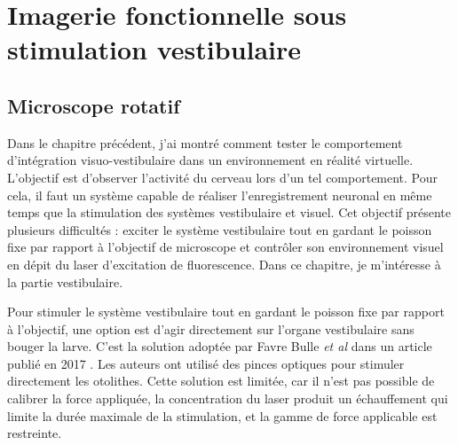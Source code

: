 \chapter[Imagerie sous stim. vestibulaire]{Imagerie fonctionnelle sous \\ stimulation vestibulaire}\label{chapIII}



\section{Microscope rotatif}

Dans le chapitre précédent, j'ai montré comment tester le comportement d'intégration visuo-vestibulaire dans un environnement en réalité virtuelle. L'objectif est d'observer l'activité du cerveau lors d'un tel comportement. Pour cela, il faut un système capable de réaliser l'enregistrement neuronal en même temps que la stimulation des systèmes vestibulaire et visuel. Cet objectif présente plusieurs difficultés : exciter le système vestibulaire tout en gardant le poisson fixe par rapport à l'objectif de microscope et contrôler son environnement visuel en dépit du laser d'excitation de fluorescence. Dans ce chapitre, je m'intéresse à la partie vestibulaire.

Pour stimuler le système vestibulaire tout en gardant le poisson fixe par rapport à l'objectif, une option est d'agir directement sur l'organe vestibulaire sans bouger la larve. C'est la solution adoptée par Favre Bulle \emph{et al} dans un article publié en 2017 \cite{favre-bulle_optical_2017}. Les auteurs ont utilisé des pinces optiques pour stimuler directement les otolithes. Cette solution est limitée, car il n'est pas possible de calibrer la force appliquée, la concentration du laser produit un échauffement qui limite la durée maximale de la stimulation, et la gamme de force applicable est restreinte.

